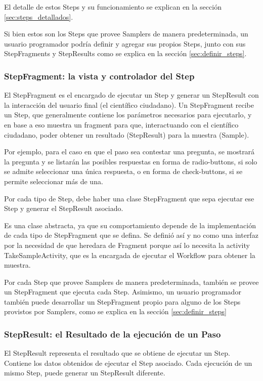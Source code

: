 El detalle de estos Steps y su funcionamiento se explican en la sección \ref{sec:steps_detallados}.

Si bien estos son los Steps que provee Samplers de manera predeterminada, un usuario programador podría definir y agregar sus propios Steps, junto con sus StepFragments y StepResults como se explica en la sección \ref{sec:definir_steps}.

\subsubsection{StepFragment: la vista y controlador del Step}
El StepFragment es el encargado de ejecutar un Step y generar un StepResult con la interacción del usuario final (el científico ciudadano). Un StepFragment recibe un Step, que generalmente contiene los parámetros necesarios para ejecutarlo, y en base a eso muestra un fragment para que, interactuando con el científico ciudadano, poder obtener un resultado (StepResult) para la muestra (Sample). 

Por ejemplo, para el caso en que el paso sea contestar una pregunta, se mostrará la pregunta y se listarán las posibles respuestas en forma de radio-buttons, si solo se admite seleccionar una única respuesta, o en forma de check-buttons, si se permite seleccionar más de una.

Por cada tipo de Step, debe haber una clase StepFragment que sepa ejecutar ese Step y generar el StepResult asociado.

Es una clase abstracta, ya que su comportamiento depende de la implementación de cada tipo de StepFragment que se defina. Se definió así y no como una interfaz por la necesidad de que heredara de Fragment porque así lo necesita la activity TakeSampleActivity, que es la encargada de ejecutar el Workflow para obtener la muestra.

Por cada Step que provee Samplers de manera predeterminada, también se provee un StepFragment que ejecuta cada Step. Asimismo, un usuario programador también puede desarrollar un StepFragment propio para alguno de los Steps provistos por Samplers, como se explica en la sección \ref{sec:definir_steps}



\subsubsection{StepResult: el Resultado de la ejecución de un Paso}
El StepResult representa el resultado que se obtiene de ejecutar un Step. Contiene los datos obtenidos de ejecutar el Step asociado. Cada ejecución de un mismo Step, puede generar un StepResult diferente.

